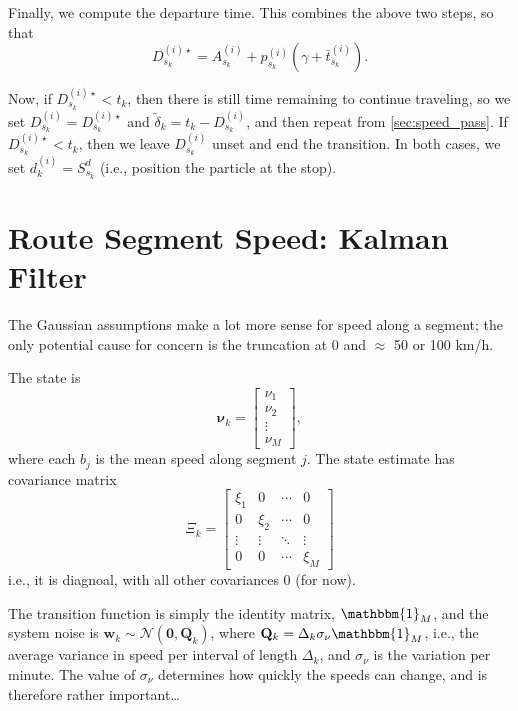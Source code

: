\documentclass[14paper,twoside]{article}
\newcommand{\bnu}{\boldsymbol{\nu}}
\newcommand{\bw}{\mathbf{w}}
\newcommand{\bQ}{\mathbf{Q}}
\begin{document}
Finally, we compute the departure time.
This combines the above two steps, so that 
\begin{equation}
  \label{eq:departure_time}
  D_{s_k}^{(i)\star} = A_{s_k}^{(i)} + p_{s_k}^{(i)} \left( \gamma + \bar t_{s_k}^{(i)} \right).
\end{equation}

Now, if $D_{s_k}^{(i)\star} < t_k$, then there is still time remaining to continue traveling,
so we set $D_{s_k}^{(i)} = D_{s_k}^{(i)\star}$ and $\tilde\delta_k = t_k - D_{s_k}^{(i)}$,
and then repeat from \cref{sec:speed_pass}.
If $D_{s_k}^{(i)\star} < t_k$, then we leave $D_{s_k}^{(i)}$ unset and end the transition.
In both cases, we set $d_k^{(i)} = S_{s_k}^d$ (i.e., position the particle at the stop).


\section{Route Segment Speed: Kalman Filter}
\label{sec:speed}


The Gaussian assumptions make a lot more sense for speed along a segment;
the only potential cause for concern is the truncation at 0
and $\approx$ 50 or 100 km/h.

The state is
\begin{equation}
  \label{eq:speed_state}
  \bnu_k = 
  \begin{bmatrix}
    \nu_1 \\ \nu_2 \\ \vdots \\ \nu_M
  \end{bmatrix},
\end{equation}
where each $b_j$ is the mean speed along segment $j$.
The state estimate has covariance matrix 
\begin{equation}
  \label{eq:state_cov}
  \Xi_k = 
  \begin{bmatrix}
    \xi_1 & 0 & \cdots & 0 \\
    0 & \xi_2 & \cdots & 0 \\
    \vdots & \vdots & \ddots & \vdots \\
    0 & 0 & \cdots & \xi_M
  \end{bmatrix}
\end{equation}
i.e., it is diagnoal, with all other covariances 0 (for now).

The transition function is simply the identity matrix, $\mathbbm{1}_M$,
and the system noise is $\bw_k \sim \mathcal{N}(\mathbf{0}, \bQ_k)$,
where $\bQ_k = \Delta_k \sigma_\nu \mathbbm{1}_M$,
i.e., the average variance in speed per interval of length $\Delta_k$,
and $\sigma_\nu$ is the variation per minute.
The value of $\sigma_\nu$ determines how quickly the speeds can change,
and is therefore rather important\ldots
\end{document}
